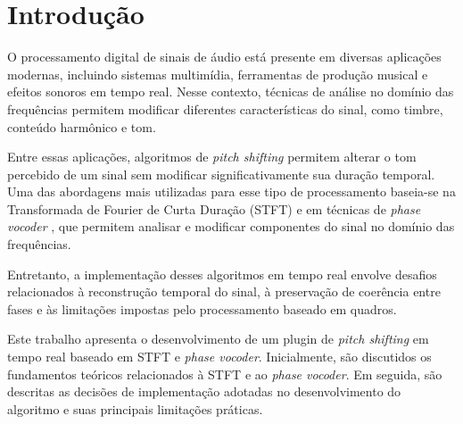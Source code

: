 \section{Introdução}\label{sec:intro}

O processamento digital de sinais de áudio está presente em diversas aplicações modernas, incluindo sistemas multimídia, ferramentas de produção musical e efeitos sonoros em tempo real. Nesse contexto, técnicas de análise no domínio das frequências permitem modificar diferentes características do sinal, como timbre, conteúdo harmônico e tom.

Entre essas aplicações, algoritmos de \textit{pitch shifting} permitem alterar o tom percebido de um sinal sem modificar significativamente sua duração temporal. Uma das abordagens mais utilizadas para esse tipo de processamento baseia-se na Transformada de Fourier de Curta Duração (STFT) e em técnicas de \textit{phase vocoder} \cite{dolson1986,flanagan1966}, que permitem analisar e modificar componentes do sinal no domínio das frequências.

Entretanto, a implementação desses algoritmos em tempo real envolve desafios relacionados à reconstrução temporal do sinal, à preservação de coerência entre fases e às limitações impostas pelo processamento baseado em quadros.

Este trabalho apresenta o desenvolvimento de um plugin de \textit{pitch shifting} em tempo real baseado em STFT e \textit{phase vocoder}. Inicialmente, são discutidos os fundamentos teóricos relacionados à STFT e ao \textit{phase vocoder}. Em seguida, são descritas as decisões de implementação adotadas no desenvolvimento do algoritmo e suas principais limitações práticas.



